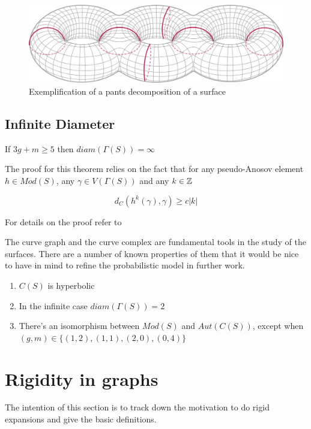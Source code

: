 \vspace{1cm}
\begin{figure}[h!]
	\centering
	\includegraphics[scale=0.4]{Figures/Pantalones.png}
	\caption{Exemplification of a pants decomposition of a surface}
\end{figure}

\subsection{Infinite Diameter}
\begin{theorem}
If $3g+m\geq 5$ then $diam(\Gamma(S)) = \infty$
\end{theorem}

The proof for this theorem relies on the fact that for any pseudo-Anosov element $h \in Mod(S)$, any $\gamma \in V(\Gamma(S))$ and any $k\in \mathbb{Z}$

$$d_{C}(h^{k}(\gamma), \gamma) \geq c|k|$$
 
For details on the proof refer to \cite[Masur and Minsky]{Masur}

The curve graph and the curve complex are fundamental tools in the study of the surfaces. There are a number of known properties of them that it would be nice to have in mind to refine the probabilistic model in further work.

\begin{enumerate}
\item $C(S)$ is hyperbolic
\item In the infinite case $diam(\Gamma(S))= 2$
\item There's an isomorphism between $Mod(S)$ and $Aut(C(S))$, except when $(g,m) \in \{(1,2), (1,1), (2,0), (0,4)\}$
\end{enumerate}

\section{Rigidity in graphs}

The intention of this section is to track down the motivation to do rigid expansions and give the basic definitions. 

